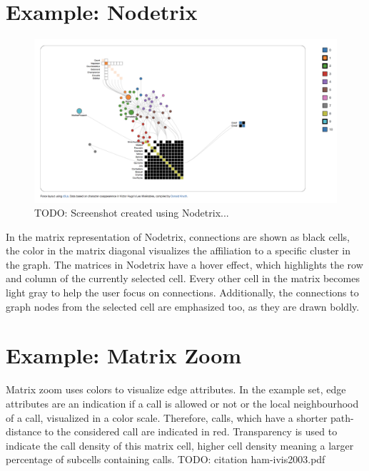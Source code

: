 \section{Example: Nodetrix}


\begin{figure}[H]
\includegraphics[width=\textwidth]{images/nodetrix_cell}
\caption{TODO: Screenshot created using Nodetrix...\label{fig:cell_nodetrix}}
\end{figure}



In the matrix representation of Nodetrix, connections are shown as black cells, the color in the matrix diagonal visualizes the affiliation to a specific cluster in the graph. The matrices in Nodetrix have a hover effect, which highlights the row and column of the currently selected cell. Every other cell in the matrix becomes light gray to help the user focus on connections. Additionally, the connections to graph nodes from the selected cell are emphasized too, as they are drawn boldly. 

\section{Example: Matrix Zoom}


Matrix zoom uses colors to visualize edge attributes. In the example set, edge attributes are an indication if a call is allowed or not or the local neighbourhood of a call, visualized in a color scale. Therefore, calls, which have a shorter path-distance to the considered call are indicated in red. Transparency is used to indicate the call density of this matrix cell, higher cell density meaning a larger percentage of subcells containing calls. TODO: citation ham-ivis2003.pdf


